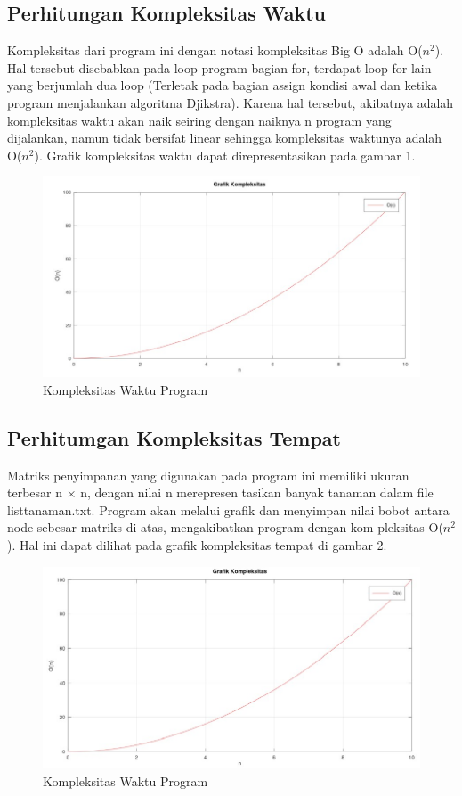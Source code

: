 \documentclass[conference]{IEEEtran}
\begin{document}
\subsection{Perhitungan Kompleksitas Waktu}
	Kompleksitas dari program ini dengan notasi kompleksitas Big O adalah O($n^2$). Hal tersebut disebabkan pada loop program bagian for, terdapat loop for lain yang berjumlah dua loop (Terletak pada bagian assign kondisi awal dan ketika program menjalankan algoritma Djikstra). Karena hal tersebut, akibatnya adalah kompleksitas waktu akan naik seiring dengan naiknya n program yang dijalankan, namun tidak bersifat linear sehingga kompleksitas waktunya adalah O($n^2$). Grafik kompleksitas waktu dapat direpresentasikan pada gambar 1.
\begin{figure}[htbp]
\includegraphics[scale=0.55]{pic2}
\caption{Kompleksitas Waktu Program}
\end{figure}
\subsection{Perhitumgan Kompleksitas Tempat}
	Matriks penyimpanan yang digunakan pada program ini memiliki ukuran terbesar n × n, dengan nilai n merepresen tasikan banyak tanaman dalam file listtanaman.txt. Program akan melalui grafik dan menyimpan nilai bobot antara node sebesar matriks di atas, mengakibatkan program dengan kom pleksitas O($n^2$ ). Hal ini dapat dilihat pada grafik kompleksitas tempat di gambar 2.
\begin{figure}[htbp]
\includegraphics[scale=0.55]{pic3}
\caption{Kompleksitas Waktu Program}
\end{figure}
\end{document}
